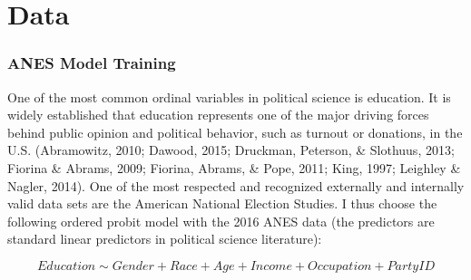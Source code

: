 \documentclass[12pt,econ]{sources/authesis}
\begin{document}
\hypertarget{ordblock-data}{%
\section{Data}\label{ordblock-data}}

\hypertarget{ordblock-data-opmodel}{%
\subsubsection{ANES Model Training}\label{ordblock-data-opmodel}}

One of the most common ordinal variables in political science is education. It is widely established that education represents one of the major driving forces behind public opinion and political behavior, such as turnout or donations, in the U.S. (Abramowitz, 2010; Dawood, 2015; Druckman, Peterson, \& Slothuus, 2013; Fiorina \& Abrams, 2009; Fiorina, Abrams, \& Pope, 2011; King, 1997; Leighley \& Nagler, 2014). One of the most respected and recognized externally and internally valid data sets are the American National Election Studies. I thus choose the following ordered probit model with the 2016 ANES data (the predictors are standard linear predictors in political science literature):

\vspace{-1cm}

\[Education \sim Gender + Race + Age + Income + Occupation + Party ID\]
\end{document}
